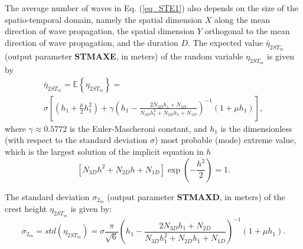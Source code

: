 The average number of waves in Eq. (\ref{eq_STE1}) also depends on the size of the spatio-temporal domain, namely the spatial dimension $X$ along the mean direction of wave propagation, the spatial dimension $Y$ orthogonal to the mean direction of wave propagation, and the duration $D$. The expected value $\bar{\eta}_{2ST_m}$ (output parameter \textbf{STMAXE}, in meters) of the random variable $\eta_{2ST_m}$ is given by
\begin{multline}
\bar{\eta}_{2ST_m}=\mathbb{E}\left\{\eta_{2ST_m} \right\} = \\ 
	\sigma \left[(h_1+\frac{\mu}{2}h_1^{2})+
\gamma \left( h_1-\frac{2N_{3D}h_1+N_{2D}}{N_{3D} h_1^{2}+N_{2D} h_1+N_{1D}}\right)^{-1} (1+\mu h_1) \right],
\label{eq_STE3}
\end{multline}
where $\gamma \approx 0.5772$ is the Euler-Mascheroni constant, and $h_1$ is the dimensionless (with respect to the standard deviation $\sigma$) most probable (mode) extreme value, which is the largest solution of the implicit equation in $h$
\begin{equation}
\left[N_{3D} h^{2} + N_{2D} h + N_{1D} \right] \exp{ \left( -\frac{h^2}{2} \right)}=1.
\label{eq_STE4}
\end{equation}

The standard deviation $\sigma_{2_m}$ (output parameter \textbf{STMAXD}, in meters) of the crest height $\eta_{2ST_m}$ is given by:
\begin{equation}
\sigma_{2_m}=std(\eta_{2ST_m})=\sigma \frac{\pi}{\sqrt{6}} \left( h_1-\frac{2N_{3D}h_1+N_{2D}}{N_{3D} h_1^{2}+N_{2D} h_1+N_{1D}}\right)^{-1} (1+\mu h_1) .
\label{eq_STE5}
\end{equation}

